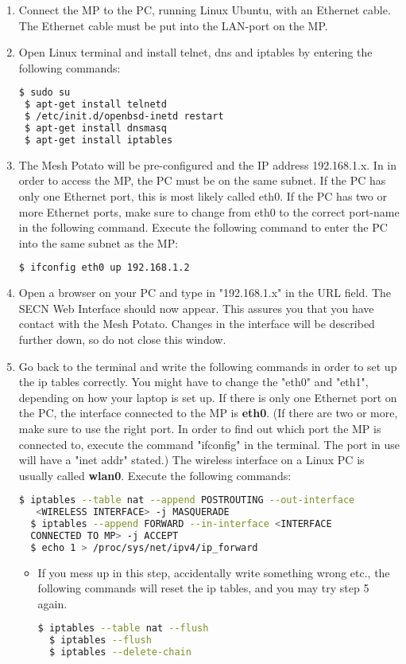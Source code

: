 

\begin{enumerate}
\item Connect the MP to the PC, running Linux Ubuntu, with an Ethernet cable. The Ethernet cable must be put into the LAN-port on the MP. 

\item Open Linux terminal and install telnet, dns and iptables by entering the following commands: 
\noindent
\begin{lstlisting}[language=bash]
 $ sudo su
 $ apt-get install telnetd
 $ /etc/init.d/openbsd-inetd restart 
 $ apt-get install dnsmasq
 $ apt-get install iptables
\end{lstlisting}

\item The Mesh Potato will be pre-configured and the IP address 192.168.1.x. In in order to access the MP, the PC must be on the same subnet. If the PC has only one Ethernet port, this is most likely called eth0. If the PC has two or more Ethernet ports, make sure to change from eth0 to the correct port-name in the following command. Execute the following command to enter the PC into the same subnet as the MP: 
\noindent
\begin{lstlisting}[language=bash]
  $ ifconfig eth0 up 192.168.1.2
\end{lstlisting}

\item Open a browser on your PC and type in "192.168.1.x" in the URL field. The SECN Web Interface should now appear. This assures you that you have contact with the Mesh Potato. Changes in the interface will be described further down, so do not close this window.  

\item Go back to the terminal and write the following commands in order to set up the ip tables correctly. You might have to change the "eth0" and "eth1", depending on how your laptop is set up. If there is only one Ethernet port on the PC, the interface connected to the MP is \textbf{eth0}. (If there are two or more, make sure to use the right port. In order to find out which port the MP is connected to, execute the command "ifconfig" in the terminal. The port in use will have a "inet addr" stated.) The wireless interface on a Linux PC is usually called \textbf{wlan0}. Execute the following commands: 
\noindent
\begin{lstlisting}[language=bash]
  $ iptables --table nat --append POSTROUTING --out-interface
   <WIRELESS INTERFACE> -j MASQUERADE
  $ iptables --append FORWARD --in-interface <INTERFACE 
  CONNECTED TO MP> -j ACCEPT
  $ echo 1 > /proc/sys/net/ipv4/ip_forward
\end{lstlisting} 
\begin{itemize}
\item If you mess up in this step, accidentally write something wrong etc., the following commands will reset the ip tables, and you may try step 5 again.
\noindent
\begin{lstlisting}[language=bash]
  $ iptables --table nat --flush
  $ iptables --flush
  $ iptables --delete-chain
\end{lstlisting}
\end{itemize}  


\end{enumerate}
